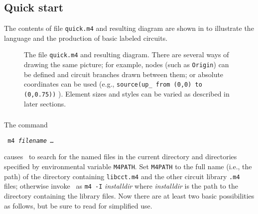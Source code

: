 \subsection{Quick start\label{Quickstart:}}
The contents of file {\tt quick.m4} and resulting diagram are shown in
 to illustrate the language
and the production of basic labeled circuits.
\begin{figure}[h!]
   \parbox{\textwidth}{\small}%
   \hfill\llap{\raise-1.15in\hbox{ }}%
   \vspace*{-\baselineskip}%
   \caption{The file {\tt quick.m4} and resulting diagram.
     There are several ways of drawing the same picture; for example,
      nodes (such as {\tt Origin}) can be defined and circuit branches
      drawn between them; or absolute coordinates can be used (e.g.,
      {\tt source(up\_ from (0,0) to (0,0.75))} ).  Element sizes and styles
      can be varied as described in later sections.\label{quick}}%
   \end{figure}

\subsubsection{%
\label{Usingmfour:}}
The command

  {\vspace*\parsep\tt
    m4 {\sl filename \ldots}
   \vspace*\parsep}

\noindent
causes \Mfour\ to search for the named
files in the current directory and directories specified
by environmental variable {\tt M4PATH}. 
Set {\tt M4PATH} to the full name (i.e., the path) of the directory containing
{\tt libcct.m4} and the other circuit library {\tt .m4} files; otherwise
invoke \Mfour\ as {\tt m4 -I} {\sl installdir} 
where {\sl installdir} is the path to the directory
containing the library files.
Now there are at least two basic possibilities as follows,
but be sure to read  for simplified use.

